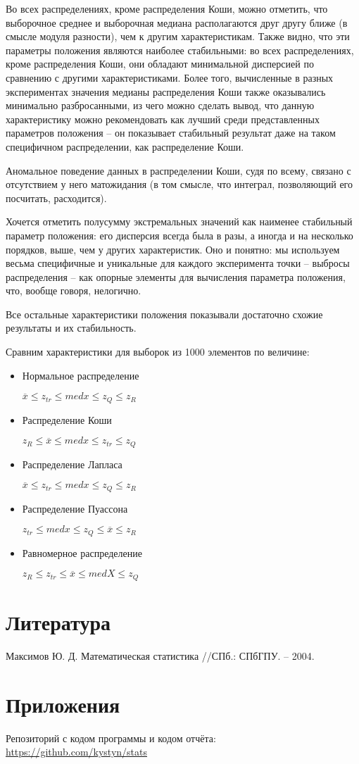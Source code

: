 Во всех распределениях, кроме распределения Коши, можно отметить, что выборочное среднее и выборочная медиана располагаются друг другу ближе (в смысле модуля разности), чем к другим характеристикам. Также видно, что эти параметры положения являются наиболее стабильными: во всех распределениях, кроме распределения Коши, они обладают минимальной дисперсией по сравнению с другими характеристиками. Более того, вычисленные в разных экспериментах значения медианы распределения Коши также оказывались минимально разбросанными, из чего можно сделать вывод, что данную характеристику можно рекомендовать как лучший среди представленных параметров положения -- он показывает стабильный результат даже на таком специфичном распределении, как распределение Коши.

Аномальное поведение данных в распределении Коши, судя по всему, связано с отсутствием у него матожидания (в том смысле, что интеграл, позволяющий его посчитать, расходится).

Хочется отметить полусумму экстремальных значений как наименее стабильный параметр положения: его дисперсия всегда была в разы, а иногда и на несколько порядков, выше, чем у других характеристик. Оно и понятно: мы используем весьма специфичные и уникальные для каждого эксперимента точки -- выбросы распределения -- как опорные элементы для вычисления параметра положения, что, вообще говоря, нелогично.

Все остальные характеристики положения показывали достаточно схожие результаты и их стабильность.

Сравним характеристики для выборок из 1000 элементов по величине:
\begin{itemize}
	\item Нормальное распределение
	
	$\overline{x} \leq z_{tr} \leq med{x} \leq z_Q \leq z_R $
	
	\item Распределение Коши
	
	$z_R \leq \overline{x} \leq med{x} \leq z_{tr} \leq z_Q $
	
	\item Распределение Лапласа
	
	$ \overline{x} \leq z_{tr} \leq med{x} \leq z_Q \leq z_R $
	
	\item Распределение Пуассона
	
	$ z_{tr} \leq med{x} \leq z_Q \leq \overline{x} \leq z_R $
	
	\item Равномерное распределение
	
	$ z_R \leq z_{tr} \leq \overline{x} \leq med{X} \leq z_Q $
	
\end{itemize}

\section{Литература}
Максимов Ю. Д. Математическая статистика //СПб.: СПбГПУ. – 2004.

\section{Приложения}

Репозиторий с кодом программы и кодом отчёта: \href{https://github.com/kystyn/stats}{https://github.com/kystyn/stats}



